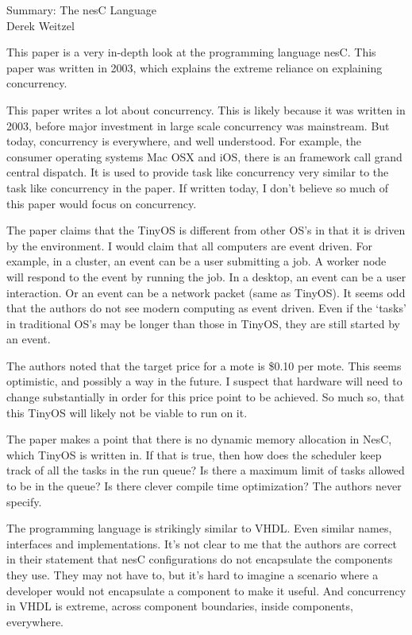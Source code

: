 \documentclass[12pt]{article}
\begin{document}
\begin{center}
{\huge Summary: The nesC Language} \\
Derek Weitzel
\end{center}

This paper is a very in-depth look at the programming language nesC.  This paper was written in 2003, which explains the extreme reliance on explaining concurrency.  

This paper writes a lot about concurrency.  This is likely because it was written in 2003, before major investment in large scale concurrency was mainstream.  But today, concurrency is everywhere, and well understood. For example, the consumer operating systems Mac OSX and iOS, there is an framework call grand central dispatch.  It is used to provide task like concurrency very similar to the task like concurrency in the paper.  If written today, I don't believe so much of this paper would focus on concurrency.

The paper claims that the TinyOS is different from other OS's in that it is driven by the environment.  I would claim that all computers are event driven.  For example, in a cluster, an event can be a user submitting a job.  A worker node will respond to the event by running the job.  In a desktop, an event can be a user interaction.  Or an event can be a network packet (same as TinyOS).  It seems odd that the authors do not see modern computing as event driven.  Even if the `tasks' in traditional OS's may be longer than those in TinyOS, they are still started by an event.

The authors noted that the target price for a mote is \$0.10 per mote.  This seems optimistic, and possibly a way in the future.  I suspect that hardware will need to change substantially in order for this price point to be achieved.  So much so, that this TinyOS will likely not be viable to run on it.

The paper makes a point that there is no dynamic memory allocation in NesC, which TinyOS is written in.  If that is true, then how does the scheduler keep track of all the tasks in the run queue?  Is there a maximum limit of tasks allowed to be in the queue?  Is there clever compile time optimization?  The authors never specify.

The programming language is strikingly similar to VHDL.  Even similar names, interfaces and implementations.  It's not clear to me that the authors are correct in their statement that nesC configurations do not encapsulate the components they use.  They may not have to, but it's hard to imagine a scenario where a developer would not encapsulate a component to make it useful.  And concurrency in VHDL is extreme, across component boundaries, inside components, everywhere.
\end{document}
